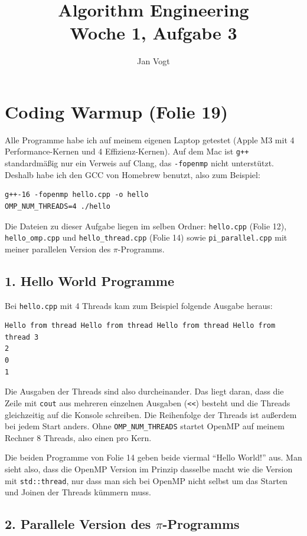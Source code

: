 \documentclass[11pt]{article}
\title{Algorithm Engineering\\Woche 1, Aufgabe 3}
\author{Jan Vogt}
\date{}
\begin{document}
\maketitle

\section*{Coding Warmup (Folie 19)}

Alle Programme habe ich auf meinem eigenen Laptop getestet (Apple M3 mit 4 Performance-Kernen und
4 Effizienz-Kernen). Auf dem Mac ist \texttt{g++} standardmäßig nur ein Verweis auf Clang, das
\texttt{-fopenmp} nicht unterstützt. Deshalb habe ich den GCC von Homebrew benutzt, also zum
Beispiel:
\begin{verbatim}
g++-16 -fopenmp hello.cpp -o hello
OMP_NUM_THREADS=4 ./hello
\end{verbatim}
Die Dateien zu dieser Aufgabe liegen im selben Ordner: \texttt{hello.cpp} (Folie 12),
\texttt{hello\_omp.cpp} und \texttt{hello\_thread.cpp} (Folie 14) sowie \texttt{pi\_parallel.cpp}
mit meiner parallelen Version des $\pi$-Programms.

\subsection*{1. Hello World Programme}

Bei \texttt{hello.cpp} mit 4 Threads kam zum Beispiel folgende Ausgabe heraus:
\begin{verbatim}
Hello from thread Hello from thread Hello from thread Hello from thread 3
2
0
1
\end{verbatim}
Die Ausgaben der Threads sind also durcheinander. Das liegt daran, dass die Zeile mit
\texttt{cout} aus mehreren einzelnen Ausgaben (\verb|<<|) besteht
und die Threads gleichzeitig auf die Konsole schreiben. Die Reihenfolge der Threads ist außerdem
bei jedem Start anders. Ohne \texttt{OMP\_NUM\_THREADS} startet OpenMP auf meinem Rechner 8 Threads,
also einen pro Kern.

Die beiden Programme von Folie 14 geben beide viermal "`Hello World!"' aus. Man sieht also, dass
die OpenMP Version im Prinzip dasselbe macht wie die Version mit \texttt{std::thread}, nur dass man
sich bei OpenMP nicht selbst um das Starten und Joinen der Threads kümmern muss.

\subsection*{2. Parallele Version des $\pi$-Programms}
\end{document}
